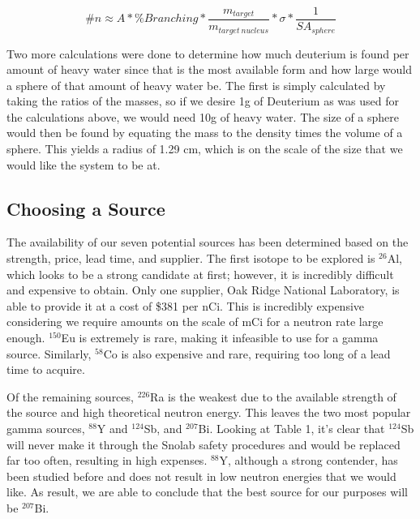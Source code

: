 \documentclass[%
12pt,
twoside,
reprint,
amsmath,amssymb,
aps,
]{article}
\begin{document}
	\begin{equation}
	\#n \approx A * \% Branching * \frac{m_{target}}{m_{target\ nucleus}} * \sigma * \frac{1}{SA_{sphere}}
	\end{equation}
	
	\par Two more calculations were done to determine how much deuterium is found per amount of heavy water since that is the most available form and how large would a sphere of that amount of heavy water be. The first is simply calculated by taking the ratios of the masses, so if we desire 1g of Deuterium as was used for the calculations above, we would need 10g of heavy water. The size of a sphere would then be found by equating the mass to the density times the volume of a sphere. This yields a radius of 1.29 cm, which is on the scale of the size that we would like the system to be at.
	
	\subsection{Choosing a Source}
	\par The availability of our seven potential sources has been determined based on the strength, price, lead time, and supplier. The first isotope to be explored is $^{26}$Al, which looks to be a strong candidate at first; however, it is incredibly difficult and expensive to obtain. Only one supplier, Oak Ridge National Laboratory, is able to provide it at a cost of \$381 per nCi. This is incredibly expensive considering we require amounts on the scale of mCi for a neutron rate large enough. $^{150}$Eu is extremely is rare, making it infeasible to use for a gamma source. Similarly, $^{58}$Co is also expensive and rare, requiring too long of a lead time to acquire.
	\par Of the remaining sources, $^{226}$Ra is the weakest due to the available strength of the source and high theoretical neutron energy. This leaves the two most popular gamma sources, $^{88}$Y and $^{124}$Sb, and $^{207}$Bi. Looking at Table 1, it's clear that $^{124}$Sb will never make it through the Snolab safety procedures and would be replaced far too often, resulting in high expenses. $^{88}$Y, although a strong contender, has been studied before and does not result in low neutron energies that we would like. As result, we are able to conclude that the best source for our purposes will be $^{207}$Bi.
	
\end{document}
